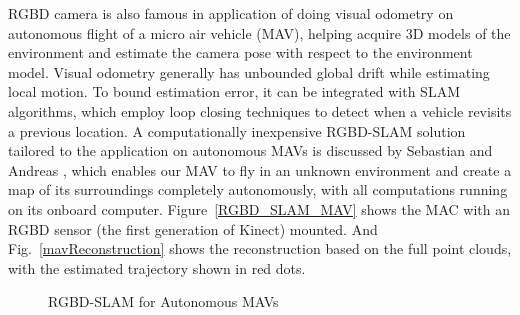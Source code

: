%
\gls{RGBD} camera is also famous in application of doing visual odometry on autonomous flight of a micro air vehicle (MAV), helping acquire \gls{3D} models of the environment and estimate the camera pose with respect to the environment model. Visual odometry generally has unbounded global drift while estimating local motion. To bound estimation error, it can be integrated with \gls{SLAM} algorithms, which employ loop closing techniques to detect when a vehicle revisits a previous location. A computationally inexpensive \gls{RGBD}-\gls{SLAM} solution tailored to the application on autonomous MAVs is discussed by Sebastian and Andreas \cite{RGBDSLAMmav_2013}, which enables our MAV to fly in an unknown environment and create a map of its surroundings completely autonomously, with all computations running on its onboard computer. Figure~\ref{RGBD_SLAM_MAV} shows the MAC with an \gls{RGBD} sensor (the first generation of Kinect) mounted. And Fig.~\ref{mavReconstruction} shows the reconstruction based on the full point clouds, with the estimated trajectory shown in red dots. 
%
\\\indent
%
\begin{figure}[t]
\centering
{}
\caption{RGBD-SLAM for Autonomous MAVs \cite{RGBDSLAMmav_2013}}
\label{autoRGBD_SLAM_MAV}
\end{figure}%
